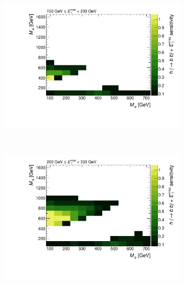 \begin{figure}[tbp]
\centering
\begin{subfigure}{0.48\textwidth}
\includegraphics[width = \textwidth]{texinputs/04_grid/figures/monoHbb_sensi_bin_1_ma_vs_mA_lin.pdf}
\end{subfigure}
~
\begin{subfigure}{0.48\textwidth}
\includegraphics[width = \textwidth]{texinputs/04_grid/figures/monoHbb_sensi_bin_2_ma_vs_mA_lin.pdf}
\end{subfigure}
\\
\centering
\begin{subfigure}{0.48\textwidth}

\end{subfigure}
\end{figure}
